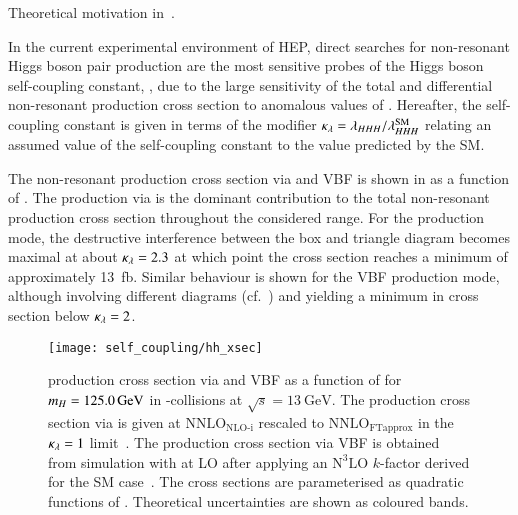 Theoretical motivation
in~.

In the current experimental environment of HEP, direct searches for
non-resonant Higgs boson pair production are the most sensitive probes
of the Higgs boson self-coupling constant, \lambdahhh, due to the
large sensitivity of the total and differential non-resonant \HH
production cross section to anomalous values of \lambdahhh. Hereafter,
the self-coupling constant is given in terms of the modifier
$\kappa_{\lambda} = \lambda_{HHH} / \lambda_{HHH}^{\text{SM}}$ relating an assumed
value of the self-coupling constant to the value predicted by the SM.

The non-resonant \HH production cross section via \ggF and VBF is
shown in  as a function of \klambda. The
production via \ggF is the dominant contribution to the total
non-resonant \HH production cross section throughout the considered
\klambda range.
For the \ggF production mode, the destructive interference between the
box and triangle diagram becomes maximal at about $\kappa_{\lambda} = 2.3$ at
which point the cross section reaches a minimum of approximately
\SI{13}{\femto\barn}. Similar behaviour is shown for the VBF
production mode, although involving different diagrams (cf.\
) and yielding a minimum in cross section below
$\kappa_{\lambda} = 2$.

\begin{figure}[htbp]
  \centering

  \texttt{[image: self\_coupling/hh\_xsec]}

  \caption{\HH production cross section via \ggF and VBF as a function
    of \klambda for $m_{H} = \SI{125.0}{\ensuremath{\text{GeV}}}$ in \pp-collisions at
    $\sqrt{s} = \SI{13}{\GeV}$. The production cross section via \ggF
    is given at $\text{NNLO}_{\text{NLO-i}}$ rescaled to
    $\text{NNLO}_{\text{FTapprox}}$ in the $\kappa_{\lambda} = 1$
    limit~\cite{Amoroso:2020lgh,Baglio:2020wgt,LHCHWGHH,Grazzini:2018bsd}. The
    production cross section via VBF is obtained from simulation with
    \MGNLO at LO after applying an $\text{N}^3\text{LO}$ $k$-factor
    derived for the SM case~\cite{Dreyer:2018qbw,LHCHWGHH}. The cross
    sections are parameterised as quadratic functions of
    \klambda. Theoretical uncertainties are shown as coloured bands.}%
  \label{fig:hh_xsec_incl}
\end{figure}

